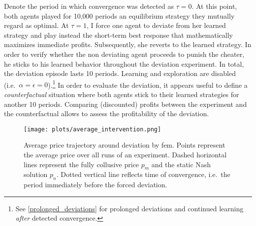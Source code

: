 Denote the period in which convergence was detected as $\tau = 0$. At this point, both agents played for 10,000 periods an equilibrium strategy they mutually regard as optimal. At $\tau = 1$, I force one agent to deviate from her learned strategy and play instead the short-term best response that mathematically maximizes immediate profits. Subsequently, she reverts to the learned strategy. In order to verify whether the non deviating agent proceeds to punish the cheater, he sticks to his learned behavior throughout the deviation experiment. In total, the deviation episode lasts 10 periods. Learning and exploration are disabled (i.e.\ $\alpha = \epsilon = 0$).\footnote{See \autoref{prolonged_deviations} for prolonged deviations and continued learning \emph{after} detected convergence.} In order to evaluate the deviation, it appears useful to define a \emph{counterfactual} situation where both agents stick to their learned strategies for another 10 periods. Comparing (discounted) profits between the experiment and the counterfactual allows to assess the profitability of the deviation.

\begin{figure}
	\texttt{[image: plots/average\_intervention.png]}
	\caption[Average price trajectory around deviation by \gls{fem}]{Average price trajectory around deviation by \gls{fem}. Points represent the average price over all runs of an experiment. Dashed horizontal lines represent the fully collusive price $p_m$ and the static Nash solution $p_n$. Dotted vertical line reflects time of convergence, i.e.\ the period immediately before the forced deviation.}
	\label{average_intervention}
\end{figure}

